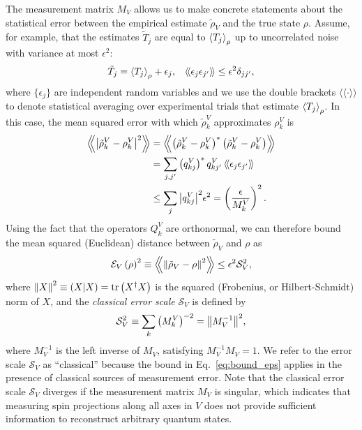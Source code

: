 \documentclass[a4paper,twocolumn,unpublished]{quantumarticle}
\newcommand{\f}[2]{\dfrac{#1}{#2}} %
\newcommand{\p}[1]{\left(#1\right)} %
\newcommand{\bk}{\Braket} %
\renewcommand{\set}[1]{\{#1\}} %
\newcommand{\bbk}[1]{\langle\!\langle #1 \rangle\!\rangle}
\newcommand{\Bbk}[1]
{\left\langle\!\!\left\langle #1 \right\rangle\!\!\right\rangle}
\newcommand{\E}{\mathcal{E}}
\renewcommand{\S}{\mathcal{S}}
\def\obk#1{\mathinner{({#1})}}
\begin{document}
The measurement matrix $M_V$ allows us to make concrete statements about the statistical error between the empirical estimate $\tilde\rho_V$ and the true state $\rho$.
Assume, for example, that the estimates $\tilde T_j$ are equal to $\bk{T_j}_\rho$ up to uncorrelated noise with variance at most $\epsilon^2$:
\begin{align}
  \tilde T_j = \bk{T_j}_\rho + \epsilon_j,
  &&
  \bbk{\epsilon_j \epsilon_{j'}} \le \epsilon^2 \delta_{jj'},
  \label{eq:error_assumption}
\end{align}
where $\set{\epsilon_j}$ are independent random variables and we use the double brackets $\bbk{\cdot}$ to denote statistical averaging over experimental trials that estimate $\bk{T_j}_\rho$.
In this case, the mean squared error with which $\tilde\rho^V_k$ approximates $\rho^V_k$ is
\begin{align}
  \Bbk{\abs{\tilde\rho^V_k-\rho^V_k}^2}
  &= \Bbk{\p{\tilde\rho^V_k-\rho^V_k}^*\p{\tilde\rho^V_k-\rho^V_k}} \\
  &= \sum_{j,j'} \p{q^V_{kj}}^* q^V_{kj'} \,
  \bbk{\epsilon_j \epsilon_{j'}} \\
  &\le \sum_j \abs{q^V_{kj}}^2 \epsilon^2
  = \p{\f{\epsilon}{M^V_k}}^2.
\end{align}
Using the fact that the operators $Q^V_k$ are orthonormal, we can therefore bound the mean squared (Euclidean) distance between $\tilde\rho_V$ and $\rho$ as
\begin{align}
  \E_V\p{\rho}^2
  \equiv \Bbk{\norm{\tilde\rho_V-\rho}^2}
  \le \epsilon^2 \S_V^2,
  \label{eq:bound_eps}
\end{align}
where $\norm{X}^2 \equiv \obk{X|X} = \tr\p{X^\dag X}$ is the squared (Frobenius, or Hilbert-Schmidt) norm of $X$, and the {\it classical error scale} $\S_V$ is defined by
\begin{align}
  \S_V^2 \equiv \sum_k \p{M^V_k}^{-2} = \norm{M_V^{-1}}^2,
\end{align}
where $M_V^{-1}$ is the left inverse of $M_V$, satisfying $M_V^{-1} M_V = 1$.
We refer to the error scale $\S_V$ as ``classical'' because the bound in Eq.~\eqref{eq:bound_eps} applies in the presence of classical sources of measurement error.
Note that the classical error scale $\S_V$ diverges if the measurement matrix $M_V$ is singular, which indicates that measuring spin projections along all axes in $V$ does not provide sufficient information to reconstruct arbitrary quantum states.
\end{document}
